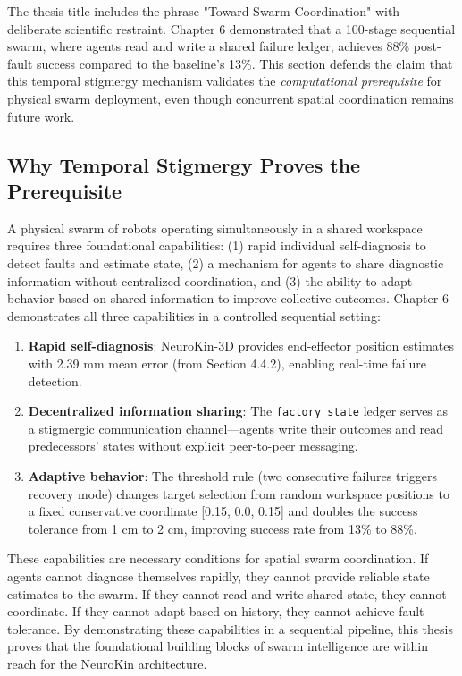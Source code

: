 \documentclass[12pt,a4paper,oneside]{report}
\begin{document}
The thesis title includes the phrase "Toward Swarm Coordination" with deliberate scientific restraint. Chapter 6 demonstrated that a 100-stage sequential swarm, where agents read and write a shared failure ledger, achieves 88\% post-fault success compared to the baseline's 13\%. This section defends the claim that this temporal stigmergy mechanism validates the \textit{computational prerequisite} for physical swarm deployment, even though concurrent spatial coordination remains future work.

\subsection{Why Temporal Stigmergy Proves the Prerequisite}

A physical swarm of robots operating simultaneously in a shared workspace requires three foundational capabilities: (1) rapid individual self-diagnosis to detect faults and estimate state, (2) a mechanism for agents to share diagnostic information without centralized coordination, and (3) the ability to adapt behavior based on shared information to improve collective outcomes. Chapter 6 demonstrates all three capabilities in a controlled sequential setting:

\begin{enumerate}
    \item \textbf{Rapid self-diagnosis}: NeuroKin-3D provides end-effector position estimates with 2.39 mm mean error (from Section 4.4.2), enabling real-time failure detection.
    \item \textbf{Decentralized information sharing}: The \texttt{factory\_state} ledger serves as a stigmergic communication channel—agents write their outcomes and read predecessors' states without explicit peer-to-peer messaging.
    \item \textbf{Adaptive behavior}: The threshold rule (two consecutive failures triggers recovery mode) changes target selection from random workspace positions to a fixed conservative coordinate [0.15, 0.0, 0.15] and doubles the success tolerance from 1 cm to 2 cm, improving success rate from 13\% to 88\%.
\end{enumerate}

These capabilities are necessary conditions for spatial swarm coordination. If agents cannot diagnose themselves rapidly, they cannot provide reliable state estimates to the swarm. If they cannot read and write shared state, they cannot coordinate. If they cannot adapt based on history, they cannot achieve fault tolerance. By demonstrating these capabilities in a sequential pipeline, this thesis proves that the foundational building blocks of swarm intelligence are within reach for the NeuroKin architecture.
\end{document}
